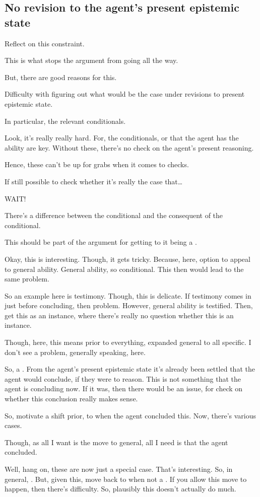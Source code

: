 \subsection{No revision to the agent's present epistemic state}
\label{sec:no-revision-agents}

\begin{note}
  Reflect on this constraint.

  This is what stops the argument from going all the way.

  But, there are good reasons for this.

  Difficulty with figuring out what would be the case under revisions to present epistemic state.

  In particular, the relevant conditionals.
\end{note}

\begin{note}
  Look, it's really really hard.
  For, the conditionals, or that the agent has the ability are key.
  Without these, there's no check on the agent's present reasoning.

  Hence, these can't be up for grabs when it comes to checks.

  If still possible to check whether it's really the case that\dots

  WAIT!

  There's a difference between the conditional and the consequent of the conditional.

  This should be part of the argument for getting to it being a \fc{}.

  Okay, this is interesting.
  Though, it gets tricky.
  Because, here, option to appeal to general ability.
  General ability, so conditional.
  This then would lead to the same problem.

  So an example here is testimony.
  Though, this is delicate.
  If testimony comes in just before concluding, then problem.
  However, general ability is testified.
  Then, get this as an instance, where there's really no question whether this is an instance.

  Though, here, this means prior to everything, expanded general to all specific.
  I don't see a problem, generally speaking, here.

  So, a \fc{}.
  From the agent's present epistemic state it's already been settled that the agent would conclude, if they were to reason.
  This is not something that the agent is concluding now.
  If it was, then there would be an issue, for check on whether this conclusion really makes sense.

  So, motivate a shift prior, to when the agent concluded this.
  Now, there's various cases.

  Though, as all I want is the move to general, all I need is that the agent concluded.

  Well, hang on, these are now just a special case.
  That's interesting.
  So, in general, \fc{}.
  But, given this, move back to when not a \fc{}.
  If you allow this move to happen, then there's difficulty.
  So, plausibly this doesn't actually do much.
\end{note}

